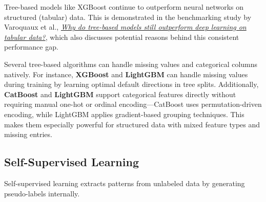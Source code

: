 \documentclass[12pt,openany]{book}
\begin{document}
\begin{notebox}
    Tree-based models like XGBoost continue to outperform neural networks on structured (tabular) data. This is demonstrated in the benchmarking study by Varoquaux et al., \href{https://doi.org/10.48550/arXiv.2207.08815}{\textit{Why do tree-based models still outperform deep learning on tabular data?}}, which also discusses potential reasons behind this consistent performance gap.
\end{notebox}

\begin{notebox}
Several tree-based algorithms can handle missing values and categorical columns natively. For instance, \textbf{XGBoost} and \textbf{LightGBM} can handle missing values during training by learning optimal default directions in tree splits. Additionally, \textbf{CatBoost} and \textbf{LightGBM} support categorical features directly without requiring manual one-hot or ordinal encoding—CatBoost uses permutation-driven encoding, while LightGBM applies gradient-based grouping techniques. This makes them especially powerful for structured data with mixed feature types and missing entries.
\end{notebox}


\subsection{Self-Supervised Learning}

Self-supervised learning extracts patterns from unlabeled data by generating 
pseudo-labels internally.
\end{document}
